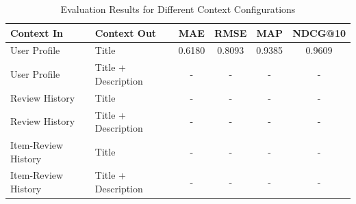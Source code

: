 \begin{table}[h]
\centering
\caption{Evaluation Results for Different Context Configurations}
\label{tab:evaluation_results}
\begin{tabular}{llcccc}
\hline
\textbf{Context In} & \textbf{Context Out} & \textbf{MAE} & \textbf{RMSE} & \textbf{MAP} & \textbf{NDCG@10} \\ \hline
User Profile & Title & 0.6180 & 0.8093 & 0.9385 & 0.9609 \\
User Profile & Title + Description & - & - & - & - \\
Review History & Title & - & - & - & - \\
Review History & Title + Description & - & - & - & - \\
Item-Review History & Title & - & - & - & - \\
Item-Review History & Title + Description & - & - & - & - \\
\hline
\end{tabular}
\end{table}